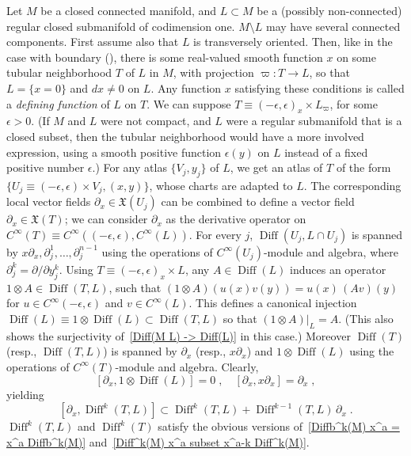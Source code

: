 \documentclass{memo-l}
\theoremstyle{plain}
\theoremstyle{definition}
\theoremstyle{remark}
\newcommand{\fX}{\mathfrak{X}}
\newcommand{\Diff}{\operatorname{Diff}}
\numberwithin{section}{chapter}
\numberwithin{equation}{section}%
\begin{document}
Let $M$ be a closed connected manifold, and $L\subset M$ be a (possibly non-connected) regular closed submanifold of codimension one. $M\setminus L$ may have several connected components. First assume also that $L$ is transversely oriented. Then, like in the case with boundary (), there is some real-valued smooth function $x$ on some tubular neighborhood $T$ of $L$ in $M$, with projection $\varpi:T\to L$, so that $L=\{x=0\}$ and $dx\ne0$ on $L$. Any function $x$ satisfying these conditions is called a \emph{defining function}  of $L$ on $T$. We can suppose $T\equiv(-\epsilon,\epsilon)_x\times L_\varpi$, for some $\epsilon>0$. (If $M$ and $L$ were not compact, and $L$ were a regular submanifold that is a closed subset, then the tubular neighborhood would have a more involved expression, using a smooth positive function $\epsilon(y)$ on $L$ instead of a fixed positive number $\epsilon$.) For any atlas $\{V_j,y_j\}$ of $L$, we get an atlas of $T$ of the form $\{U_j\equiv(-\epsilon,\epsilon)\times V_j,(x,y)\}$, whose charts are adapted to $L$. The corresponding local vector fields $\partial_x\in\fX(U_j)$ can be combined to define a vector field $\partial_x\in\fX(T)$; we can consider $\partial_x$ as the derivative operator on $C^\infty(T)\equiv C^\infty((-\epsilon,\epsilon),C^\infty(L))$. For every $j$, $\Diff(U_j,L\cap U_j)$ is spanned by $x\partial_x,\partial_j^1,\dots,\partial_j^{n-1}$ using the operations of $C^\infty(U_j)$-module and algebra, where $\partial_j^k=\partial/\partial y_j^k$. Using $T\equiv(-\epsilon,\epsilon)_x\times L$, any $A\in\Diff(L)$ induces an operator $1\otimes A\in\Diff(T,L)$, such that $(1\otimes A)(u(x)v(y))=u(x)\,(Av)(y)$ for $u\in C^\infty(-\epsilon,\epsilon)$ and $v\in C^\infty(L)$. This defines a canonical injection $\Diff(L)\equiv1\otimes\Diff(L)\subset\Diff(T,L)$ so that $(1\otimes A)|_L=A$. (This also shows the surjectivity of~\eqref{Diff(M L) -> Diff(L)} in this case.) Moreover $\Diff(T)$ (resp., $\Diff(T,L)$) is spanned by $\partial_x$ (resp., $x\partial_x$) and $1\otimes\Diff(L)$ using the operations of $C^\infty(T)$-module and algebra. Clearly,
\begin{equation}\label{[partial_x 1 otimes Diff(L)] = 0}
[\partial_x,1\otimes\Diff(L)]=0\;,\quad[\partial_x, x\partial_x]=\partial_x\;,
\end{equation}
yielding
\begin{equation}\label{[partial_x Diff^k(T L)] subset ...}
[\partial_x,\Diff^k(T,L)]\subset\Diff^k(T,L)+\Diff^{k-1}(T,L)\,\partial_x\;.
\end{equation}
$\Diff^k(T,L)$ and $\Diff^k(T)$ satisfy the obvious versions of~\eqref{Diffb^k(M) x^a = x^a Diffb^k(M)} and~\eqref{Diff^k(M) x^a subset x^a-k Diff^k(M)}.
\end{document}
